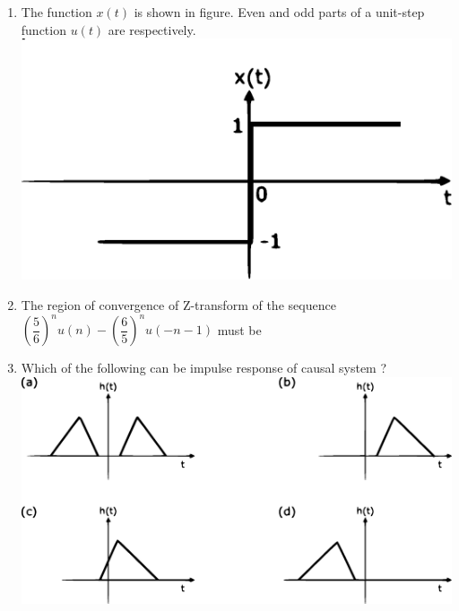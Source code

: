 \documentclass[journal,12pt,twocolumn]{IEEEtran}
\begin{document}
\begin{enumerate}
\item The function $x(t)$ is shown in figure. Even and odd parts of  a unit-step function $u(t)$ are respectively.\\

\includegraphics[scale=0.3]{fig4.eps}
\begin{enumerate}[(A)]
\end{enumerate} 

\item The region of convergence of Z-transform of the sequence $(\dfrac{5}{6})^{n}u(n)-(\dfrac{6}{5})^{n}u(-n-1)$ must be
\begin{enumerate}[(A)]
\end{enumerate}

\item Which of the following can be impulse response of causal system ?\\
\includegraphics[scale=0.2]{fig5.eps}


\end{enumerate}
\end{document}
